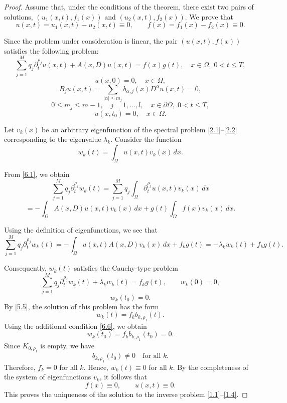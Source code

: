 \documentclass[10pt,a4paper]{amsart}
\begin{document}
\begin{proof}
Assume that, under the conditions of the theorem, there exist two pairs of solutions,
$(u_1(x,t),f_1(x))$ and $(u_2(x,t),f_2(x))$.
We prove that
\[
u(x,t)=u_1(x,t)-u_2(x,t)\equiv 0,
\qquad
f(x)=f_1(x)-f_2(x)\equiv 0.
\]

Since the problem under consideration is linear, the pair $(u(x,t),f(x))$ satisfies the following problem:
\begin{equation}\label{6.1}
\sum_{j=1}^M q_j \partial_t^{\rho_j} u(x,t) + A(x,D)u(x,t) = f(x)g(t),
\quad x \in \Omega,\; 0 < t \le T,
\end{equation}
\begin{equation}\label{6.2}
u(x,0) = 0,
\quad x \in \Omega,
\end{equation}
\begin{equation}\label{6.3}
B_j u(x,t) = \sum_{|\alpha|\le m_j} b_{\alpha,j}(x) D^\alpha u(x,t) = 0,
\end{equation}
\[
0 \le m_j \le m-1,\quad j=1,\dots,l,\quad x \in \partial\Omega,\; 0 < t \le T,
\]
\begin{equation}\label{6.4}
u(x,t_0)=0,
\quad x \in \Omega.
\end{equation}

Let $v_k(x)$ be an arbitrary eigenfunction of the spectral problem \eqref{2.1}--\eqref{2.2}
corresponding to the eigenvalue $\lambda_k$.
Consider the function
\begin{equation}\label{6.5}
w_k(t)=\int_{\Omega} u(x,t)v_k(x)\,dx.
\end{equation}

From \eqref{6.1}, we obtain
\[
\sum_{j=1}^M q_j \partial_t^{\rho_j} w_k(t)
=
\sum_{j=1}^M q_j \int_{\Omega} \partial_t^{\rho_j} u(x,t)v_k(x)\,dx
\]
\[
=
- \int_{\Omega} A(x,D)u(x,t)v_k(x)\,dx
+ g(t)\int_{\Omega} f(x)v_k(x)\,dx.
\]

Using the definition of eigenfunctions, we see that
\[
\sum_{j=1}^M q_j \partial_t^{\rho_j} w_k(t)
=
- \int_{\Omega} u(x,t)A(x,D)v_k(x)\,dx + f_k g(t)
=
- \lambda_k w_k(t) + f_k g(t).
\]

Consequently, $w_k(t)$ satisfies the Cauchy-type problem
\[
\sum_{j=1}^M q_j \partial_t^{\rho_j} w_k(t) + \lambda_k w_k(t)
=
f_k g(t),
\qquad
w_k(0)=0,
\]
\begin{equation}\label{6.6}
w_k(t_0)=0.
\end{equation}
By \eqref{5.5}, the solution of this problem has the form
\[
w_k(t)=f_k b_{k,\rho_1}(t).
\]
Using the additional condition \eqref{6.6}, we obtain
\begin{equation}\label{6.7}
w_k(t_0)=f_k b_{k,\rho_1}(t_0)=0.
\end{equation}
Since $K_{0,\rho_1}$ is empty, we have
\[
b_{k,\rho_1}(t_0)\neq 0
\quad \text{for all } k.
\]
Therefore, $f_k=0$ for all $k$.
Hence, $w_k(t)\equiv 0$ for all $k$.
By the completeness of the system of eigenfunctions $v_k$, it follows that
\[
f(x)\equiv 0,
\qquad
u(x,t)\equiv 0.
\]
This proves the uniqueness of the solution to the inverse problem \eqref{1.1}--\eqref{1.4}.
\end{proof}
\end{document}
